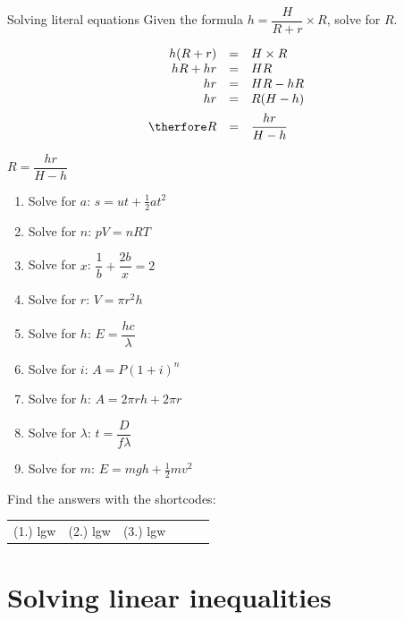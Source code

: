 \begin{wex}
{Solving literal equations}
{
Given the formula $h=\dfrac{H}{R+r} \times R$, solve for $R$.
}
{
\begin{equation*}
    \begin{array}{ccll}\hfill h(R+r)& =& H \times R\hfill & \\
	\hfill hR + hr& =& HR\hfill & \hfill \\
	\hfill hr & =& HR - hR\hfill \\
\hfill hr& =& R(H - h)\hfill \vspace{5pt}\\ 
\hfill \therfore R & =& \dfrac{hr}{H-h}\hfill 
    \end{array}
\end{equation*}

$R = \dfrac{hr}{H-h}$
} 
\end{wex}


\begin{exercises}{}
{
\begin{enumerate}[itemsep=5pt, label=\textbf{\arabic*}. ] 
\item Solve for $a$: $s=ut+\frac{1}{2}at^{2}$
\item Solve for $n$: $pV=nRT$ 
\item Solve for $x$: $\dfrac{1}{b}+\dfrac{2b}{x}=2$
\item Solve for $r$: $V = \pi r^{2} h$
\item Solve for $h$: $E=\dfrac{hc}{\lambda}$
\item Solve for $i$: $A=P(1+i)^{n}$
\item Solve for $h$: $A=2\pi rh + 2 \pi r$
\item Solve for $\lambda$: $t=\dfrac{D}{f \lambda}$
\item Solve for $m$: $E=mgh + \frac{1}{2}mv^{2}$
\end{enumerate}
\practiceinfo
\par {} Find the answers with the shortcodes:
\par \begin{tabular}[h]{cccccc}
(1.) lgw  &  (2.) lgw  &  (3.) lgw  & \end{tabular}
}
\end{exercises}

\section{Solving linear inequalities}


